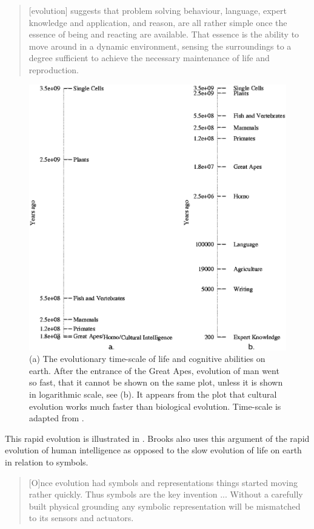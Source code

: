 \begin{quote}
[evolution] suggests that problem solving behaviour, language, expert knowledge and application, and reason, are all rather simple once the essence of being and reacting are available. That essence is the ability to move around in a dynamic environment, sensing the surroundings to a degree sufficient to achieve the necessary maintenance of life and reproduction. \citep{brooks:1990}
\end{quote}

\begin{figure}
\centerline{\includegraphics[width=12cm]{theory/evol.eps}}
\caption{(a) The evolutionary time-scale of life and cognitive abilities on earth. After the entrance of the Great Apes, evolution of man went so fast, that it cannot be shown on the same plot, unless it is shown in logarithmic scale, see (b). It appears from the plot that cultural evolution works much faster than biological evolution. Time-scale is adapted from \citealt{brooks:1990}.}
\label{f:theory:evolution}
\end{figure}


This rapid evolution is illustrated in . Brooks also uses this argument of the rapid evolution of human intelligence as opposed to the slow evolution of life on earth in relation to symbols.

\begin{quote}
[O]nce evolution had symbols and representations things started moving rather quickly. Thus symbols are the key invention ... Without a carefully built physical grounding any symbolic representation will be mismatched to its sensors and actuators. \citep{brooks:1990}
\end{quote}

